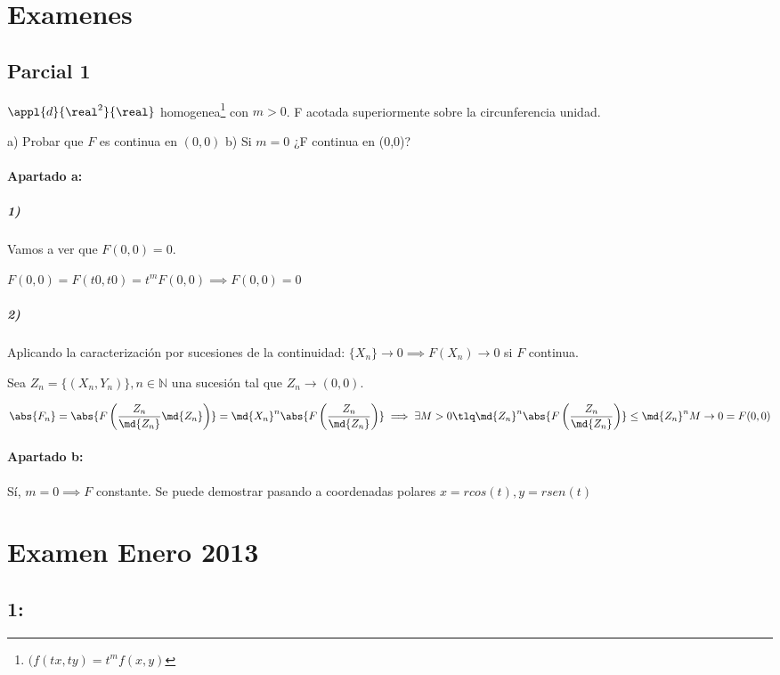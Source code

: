 

\section{Examenes}
\subsection{Parcial 1}

\begin{problem}[1]

$\appl{d}{\real^2}{\real}$ homogenea\footnote{$(f(tx,ty) = t^mf(x,y)$} con $m>0$. F acotada superiormente sobre la circunferencia unidad.

a) Probar que $F$ es continua en $(0,0)$
b) Si $m=0$ ¿F continua en (0,0)?
\solution
\paragraph{Apartado a:}
\subparagraph{1)}
Vamos a ver que $F(0,0) = 0$.

$F(0,0) = F(t0,t0) = t^mF(0,0) \implies F(0,0) = 0$

\subparagraph{2)}
Aplicando la caracterización por sucesiones de la continuidad: $\{X_n\} \rightarrow 0 \implies F(X_n) \rightarrow 0$ si $F$ continua.

Sea $Z_n = \{(X_n,Y_n)\}, n\in \mathbb{N}$ una sucesión tal que $Z_n \rightarrow (0,0)$.

\[\abs{F_n} = \abs{F\left(\frac{Z_n}{\md{Z_n}}\md{Z_n}\right)} = \md{X_n}^n \abs{F\left(\frac{Z_n}{\md{Z_n}}\right)} \implies \exists M>0 \tlq \md{Z_n}^n \abs{F\left(\frac{Z_n}{\md{Z_n}}\right)} \leq \md{Z_n}^n M \rightarrow 0 = F(0,0)\]
\paragraph{Apartado b:}
Sí, $m=0 \implies F$ constante. Se puede demostrar pasando a coordenadas polares $x=rcos(t),y=rsen(t)$

\end{problem}

\section{Examen Enero 2013}
\subsection{1:}

